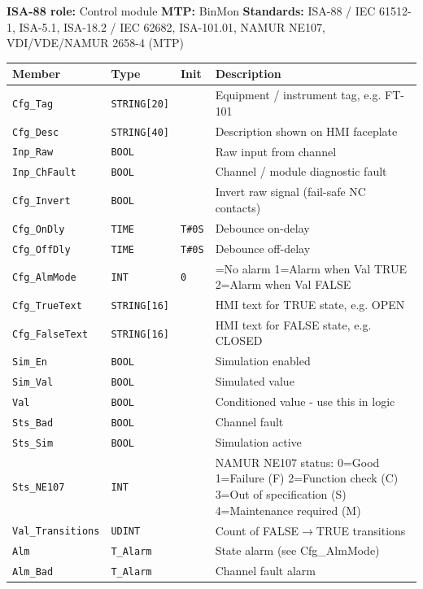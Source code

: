 {\small\textbf{ISA-88 role:} Control module \quad \textbf{MTP:} BinMon \quad \textbf{Standards:} ISA-88 /\allowbreak{} IEC 61512-1, ISA-5.1, ISA-18.2 /\allowbreak{} IEC 62682, ISA-101.01, NAMUR NE107, VDI/\allowbreak{}VDE/\allowbreak{}NAMUR 2658-4 (MTP)}
{\footnotesize
\begin{longtable}{@{}>{\raggedright\arraybackslash}p{3.4cm}>{\raggedright\arraybackslash}p{3.3cm}>{\raggedright\arraybackslash}p{1.3cm}>{\raggedright\arraybackslash}p{6.4cm}@{}}
\toprule
\rowcolor{tblhead}\textbf{Member} & \textbf{Type} & \textbf{Init} & \textbf{Description} \\
\midrule
\endhead
\texttt{Cfg\_Tag} & \texttt{STRING[20]} &  & Equipment /\allowbreak{} instrument tag, e.g. FT-101 \\
\texttt{Cfg\_Desc} & \texttt{STRING[40]} &  & Description shown on HMI faceplate \\
\texttt{Inp\_Raw} & \texttt{BOOL} &  & Raw input from channel \\
\texttt{Inp\_ChFault} & \texttt{BOOL} &  & Channel /\allowbreak{} module diagnostic fault \\
\texttt{Cfg\_Invert} & \texttt{BOOL} &  & Invert raw signal (fail-safe NC contacts) \\
\texttt{Cfg\_OnDly} & \texttt{TIME} & \texttt{T\#0S} & Debounce on-delay \\
\texttt{Cfg\_OffDly} & \texttt{TIME} & \texttt{T\#0S} & Debounce off-delay \\
\texttt{Cfg\_AlmMode} & \texttt{INT} & \texttt{0} & 0=No alarm 1=Alarm when Val TRUE 2=Alarm when Val FALSE \\
\texttt{Cfg\_TrueText} & \texttt{STRING[16]} &  & HMI text for TRUE state, e.g. OPEN \\
\texttt{Cfg\_FalseText} & \texttt{STRING[16]} &  & HMI text for FALSE state, e.g. CLOSED \\
\texttt{Sim\_En} & \texttt{BOOL} &  & Simulation enabled \\
\texttt{Sim\_Val} & \texttt{BOOL} &  & Simulated value \\
\texttt{Val} & \texttt{BOOL} &  & Conditioned value - use this in logic \\
\texttt{Sts\_Bad} & \texttt{BOOL} &  & Channel fault \\
\texttt{Sts\_Sim} & \texttt{BOOL} &  & Simulation active \\
\texttt{Sts\_NE107} & \texttt{INT} &  & NAMUR NE107 status: 0=Good 1=Failure (F) 2=Function check (C) 3=Out of specification (S) 4=Maintenance required (M) \\
\texttt{Val\_Transitions} & \texttt{UDINT} &  & Count of FALSE$\rightarrow$TRUE transitions \\
\texttt{Alm} & \texttt{T\_Alarm} &  & State alarm (see Cfg\_AlmMode) \\
\texttt{Alm\_Bad} & \texttt{T\_Alarm} &  & Channel fault alarm \\
\bottomrule
\end{longtable}
}
